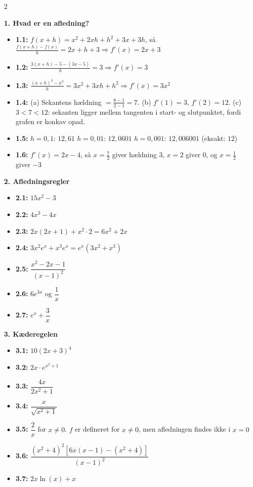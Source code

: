\documentclass[11pt,a4paper]{article}
\begin{document}
\begin{multicols}{2}
\small
\setlength{\parindent}{0pt}

\noindent\textbf{1. Hvad er en afledning?}
\begin{itemize}[leftmargin=1.3em, itemsep=1pt, topsep=2pt]
  \item \textbf{1.1:} $f(x+h) = x^{2}+2xh+h^{2}+3x+3h$, så
        $\frac{f(x+h)-f(x)}{h} = 2x+h+3 \Rightarrow f'(x) = 2x+3$
  \item \textbf{1.2:} $\frac{3(x+h)-5-(3x-5)}{h} = 3 \Rightarrow f'(x) = 3$
  \item \textbf{1.3:} $\frac{(x+h)^{3}-x^{3}}{h} = 3x^{2}+3xh+h^{2}
        \Rightarrow f'(x) = 3x^{2}$
  \item \textbf{1.4:} (a) Sekantens hældning $=\frac{8-1}{2-1} = 7$.
        (b) $f'(1) = 3$, $f'(2) = 12$. (c) $3 < 7 < 12$: sekanten ligger
        mellem tangenten i start- og slutpunktet, fordi grafen er
        konkav opad.
  \item \textbf{1.5:} $h = 0{,}1$: $12{,}61$ \quad $h = 0{,}01$: $12{,}0601$
        \quad $h = 0{,}001$: $12{,}006001$ \quad (eksakt: $12$)
  \item \textbf{1.6:} $f'(x) = 2x - 4$, så $x = \tfrac{7}{2}$ giver
        hældning $3$, $x = 2$ giver $0$, og $x = \tfrac{1}{2}$ giver $-3$
\end{itemize}

\noindent\textbf{2. Afledningsregler}
\begin{itemize}[leftmargin=1.3em, itemsep=1pt, topsep=2pt]
  \item \textbf{2.1:} $15x^{2} - 3$
  \item \textbf{2.2:} $4x^{3} - 4x$
  \item \textbf{2.3:} $2x(2x+1) + x^{2}\cdot 2 = 6x^{2} + 2x$
  \item \textbf{2.4:} $3x^{2}e^{x} + x^{3}e^{x} = e^{x}(3x^{2}+x^{3})$
  \item \textbf{2.5:} $\dfrac{x^{2}-2x-1}{(x-1)^{2}}$
  \item \textbf{2.6:} $6e^{3x}$ og $\dfrac{1}{x}$
  \item \textbf{2.7:} $e^{x} + \dfrac{3}{x}$
\end{itemize}

\noindent\textbf{3. Kæderegelen}
\begin{itemize}[leftmargin=1.3em, itemsep=1pt, topsep=2pt]
  \item \textbf{3.1:} $10(2x+3)^{4}$
  \item \textbf{3.2:} $2x \cdot e^{x^{2}+1}$
  \item \textbf{3.3:} $\dfrac{4x}{2x^{2}+1}$
  \item \textbf{3.4:} $\dfrac{x}{\sqrt{x^{2}+1}}$
  \item \textbf{3.5:} $\dfrac{2}{x}$ for $x \neq 0$. $f$ er defineret for
        $x \neq 0$, men afledningen findes ikke i $x = 0$
  \item \textbf{3.6:} $\dfrac{(x^{2}+4)^{2}\left[6x(x-1)-(x^{2}+4)\right]}{(x-1)^{2}}$
  \item \textbf{3.7:} $2x\ln(x) + x$
\end{itemize}


\end{multicols}
\end{document}

